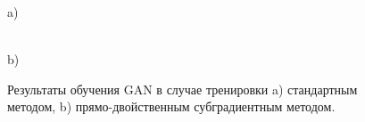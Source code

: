 \documentclass[preprint,12pt]{elsarticle}
\begin{document}
\begin{figure}[h]
\begin{minipage}[h]{0.47\linewidth}
 a) \\
\end{minipage}
\hfill
\begin{minipage}[h]{0.47\linewidth}
 \\b)
\end{minipage}
\vfill

\caption{Результаты обучения GAN в случае тренировки a) стандартным методом, b) прямо-двойственным субградиентным методом. }
\label{ris:experiment mnist}
\end{figure}
\end{document}
